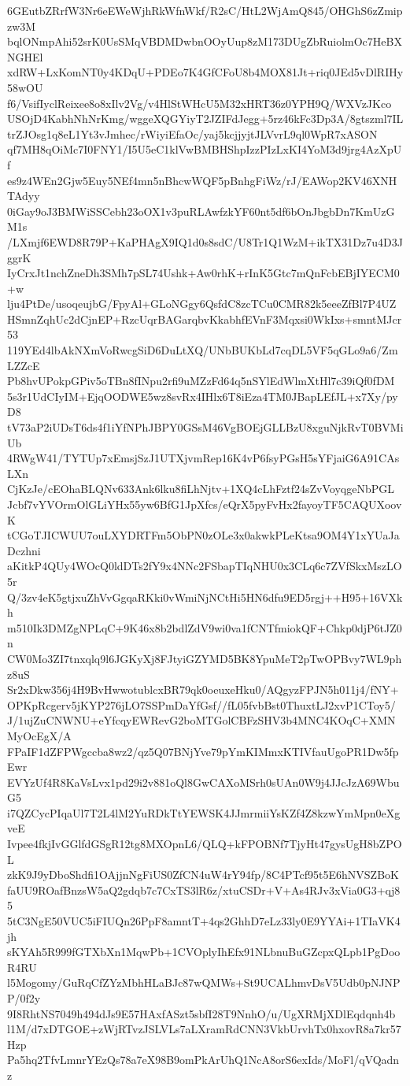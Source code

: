 6GEutbZRrfW3Nr6eEWeWjhRkWfnWkf/R2sC/HtL2WjAmQ845/OHGhS6zZmipzw3M
bqlONmpAhi52srK0UsSMqVBDMDwbnOOyUup8zM173DUgZbRuiolmOc7HeBXNGHEl
xdRW+LxKomNT0y4KDqU+PDEo7K4GfCFoU8b4MOX81Jt+riq0JEd5vDlRIHy58wOU
f6/VsifIyclReixee8o8xIlv2Vg/v4HlStWHcU5M32xHRT36z0YPH9Q/WXVzJKco
USOjD4KabhNhNrKmg/wggeXQGYiyT2JZIFdJegg+5rz46kFc3Dp3A/8gtszml7IL
trZJOsg1q8eL1Yt3vJmhec/rWiyiEfaOc/yaj5kcjjyjtJLVvrL9ql0WpR7xASON
qf7MH8qOiMc7I0FNY1/I5U5eC1klVwBMBHShpIzzPIzLxKI4YoM3d9jrg4AzXpUf
es9z4WEn2Gjw5Euy5NEf4mn5nBhcwWQF5pBnhgFiWz/rJ/EAWop2KV46XNHTAdyy
0iGay9oJ3BMWiSSCebh23oOX1v3puRLAwfzkYF60nt5df6bOnJbgbDn7KmUzGM1s
/LXmjf6EWD8R79P+KaPHAgX9IQ1d0s8sdC/U8Tr1Q1WzM+ikTX31Dz7u4D3JggrK
IyCrxJt1nchZneDh3SMh7pSL74Ushk+Aw0rhK+rInK5Gtc7mQnFcbEBjIYECM0+w
lju4PtDe/usoqeujbG/FpyAl+GLoNGgy6QsfdC8zcTCu0CMR82k5eeeZfBl7P4UZ
HSmnZqhUc2dCjnEP+RzcUqrBAGarqbvKkabhfEVnF3Mqxsi0WkIxs+smntMJcr53
119YEd4lbAkNXmVoRwcgSiD6DuLtXQ/UNbBUKbLd7cqDL5VF5qGLo9a6/ZmLZZcE
Pb8hvUPokpGPiv5oTBn8fINpu2rfi9uMZzFd64q5nSYlEdWlmXtHl7c39iQf0fDM
5s3r1UdCIyIM+EjqOODWE5wz8svRx4IHlx6T8iEza4TM0JBapLEfJL+x7Xy/pyD8
tV73aP2iUDsT6ds4f1iYfNPhJBPY0GSsM46VgBOEjGLLBzU8xguNjkRvT0BVMiUb
4RWgW41/TYTUp7xEmsjSzJ1UTXjvmRep16K4vP6fsyPGsH5sYFjaiG6A91CAsLXn
CjKzJe/cEOhaBLQNv633Ank6lku8fiLhNjtv+1XQ4cLhFztf24sZvVoyqgeNbPGL
Jcbf7vYVOrmOlGLiYHx55yw6BfG1JpXfcs/eQrX5pyFvHx2fayoyTF5CAQUXoovK
tCGoTJICWUU7ouLXYDRTFm5ObPN0zOLe3x0akwkPLeKtsa9OM4Y1xYUaJaDczhni
aKitkP4QUy4WOcQ0ldDTs2fY9x4NNc2FSbapTIqNHU0x3CLq6c7ZVfSkxMszLO5r
Q/3zv4eK5gtjxuZhVvGgqaRKki0vWmiNjNCtHi5HN6dfu9ED5rgj++H95+16VXkh
m510Ik3DMZgNPLqC+9K46x8b2bdlZdV9wi0va1fCNTfmiokQF+Chkp0djP6tJZ0n
CW0Mo3ZI7tnxqlq9l6JGKyXj8FJtyiGZYMD5BK8YpuMeT2pTwOPBvy7WL9phz8uS
Sr2xDkw356j4H9BvHwwotublcxBR79qk0oeuxeHku0/AQgyzFPJN5h011j4/fNY+
OPKpRcgerv5jKYP276jLO7SSPmDaYfGsf//fL05fvbBst0ThuxtLJ2xvP1CToy5/
J/1ujZuCNWNU+eYfcqyEWRevG2boMTGolCBFzSHV3b4MNC4KOqC+XMNMyOcEgX/A
FPaIF1dZFPWgccba8wz2/qz5Q07BNjYve79pYmKIMmxKTIVfauUgoPR1Dw5fpEwr
EVYzUf4R8KaVsLvx1pd29i2v881oQl8GwCAXoMSrh0sUAn0W9j4JJcJzA69WbuG5
i7QZCycPIqaUl7T2L4lM2YuRDkTtYEWSK4JJmrmiiYsKZf4Z8kzwYmMpn0eXgveE
Ivpee4fkjIvGGlfdGSgR12tg8MXOpnL6/QLQ+kFPOBNf7TjyHt47gysUgH8bZPOL
zkK9J9yDboShdfi1OAjjnNgFiUS0ZfCN4uW4rY94fp/8C4PTcf95t5E6hNVSZBoK
faUU9ROafBnzsW5aQ2gdqb7c7CxTS3lR6z/xtuCSDr+V+As4RJv3xVia0G3+qj85
5tC3NgE50VUC5iFIUQn26PpF8amntT+4qs2GhhD7eLz33ly0E9YYAi+1TIaVK4jh
sKYAh5R999fGTXbXn1MqwPb+1CVOplyIhEfx91NLbnuBuGZcpxQLpb1PgDooR4RU
l5Mogomy/GuRqCfZYzMbhHLaBJc87wQMWs+St9UCALhmvDsV5Udb0pNJNPP/0f2y
9I8RhtNS7049h494dJs9E57HAxfASzt5sbfI28T9NnhO/u/UgXRMjXDlEqdqnh4b
l1M/d7xDTGOE+zWjRTvzJSLVLs7aLXramRdCNN3VkbUrvhTx0hxovR8a7kr57Hzp
Pa5hq2TfvLmnrYEzQs78a7eX98B9omPkArUhQ1NcA8orS6exIds/MoFl/qVQadnz
